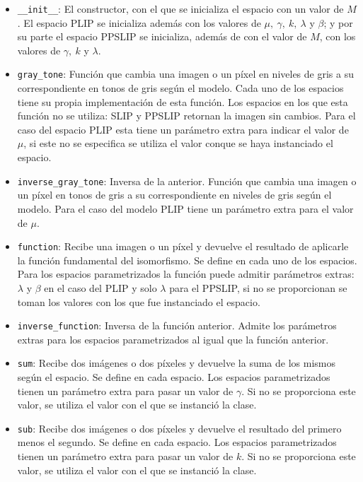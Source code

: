 \begin{itemize}
	\item \verb|__init__|: El constructor, con el que se inicializa el espacio con un valor de $M$. El espacio PLIP se inicializa adem\'as con los valores de $\mu,~\gamma,~k,~\lambda$ y $\beta$; y por su parte el espacio PPSLIP se inicializa, adem\'as de con el valor de $M$, con los valores de $\gamma,~k$ y $\lambda$.
	\item \verb|gray_tone|: Funci\'on que cambia una imagen o un p\'ixel en niveles de gris a su correspondiente en tonos de gris seg\'un el modelo. Cada uno de los espacios tiene su propia implementaci\'on de esta funci\'on. Los espacios en los que esta funci\'on no se utiliza: SLIP y PPSLIP retornan la imagen sin cambios. Para el caso del espacio PLIP esta tiene un par\'ametro extra para indicar el valor de $\mu$, si este no se especifica se utiliza el valor conque se haya instanciado el espacio.
	\item \verb|inverse_gray_tone|: Inversa de la anterior. Funci\'on que cambia una imagen o un p\'ixel en tonos de gris a su correspondiente en niveles de gris seg\'un el modelo. Para el caso del modelo PLIP tiene un par\'ametro extra para el valor de $\mu$.
	\item \verb|function|: Recibe una imagen o un p\'ixel y devuelve el resultado de aplicarle la funci\'on fundamental del isomorfismo. Se define en cada uno de los espacios. Para los espacios parametrizados la funci\'on puede admitir par\'ametros extras: $\lambda$ y $\beta$ en el caso del PLIP y solo $\lambda$ para el PPSLIP, si no se proporcionan se toman los valores con los que fue instanciado el espacio.
	\item \verb|inverse_function|: Inversa de la funci\'on anterior. Admite los par\'ametros extras para los espacios parametrizados al igual que la funci\'on anterior.
	\item \verb|sum|: Recibe dos im\'agenes o dos p\'ixeles y devuelve la suma de los mismos seg\'un el espacio. Se define en cada espacio. Los espacios parametrizados tienen un par\'ametro extra para pasar un valor de $\gamma$. Si no se proporciona este valor, se utiliza el valor con el que se instanci\'o la clase.
	\item  \verb|sub|: Recibe dos im\'agenes o dos p\'ixeles y devuelve el resultado del primero menos el segundo. Se define en cada espacio. Los espacios parametrizados tienen un par\'ametro extra para pasar un valor de $k$. Si no se proporciona este valor, se utiliza el valor con el que se instanci\'o la clase.

\end{itemize}
